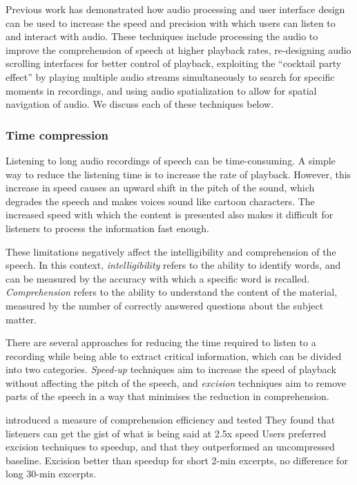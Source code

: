 Previous work has demonstrated how audio processing and user interface design can be used to increase the speed and
precision with which users can listen to and interact with audio. These techniques include processing the audio to
improve the comprehension of speech at higher playback rates, re-designing audio scrolling interfaces for better
control of playback, exploiting the ``cocktail party effect'' by playing multiple audio streams simultaneously to
search for specific moments in recordings, and using audio spatialization to allow for spatial navigation of audio. We
discuss each of these techniques below.

\subsubsection{Time compression}

Listening to long audio recordings of speech can be time-consuming. A simple way to reduce the listening time is to
increase the rate of playback.  However, this increase in speed causes an upward shift in the pitch of the sound, which
degrades the speech and makes voices sound like cartoon characters.  The increased speed with which the content is
presented also makes it difficult for listeners to process the information fast enough.

These limitations negatively affect the intelligibility and comprehension of the speech.  In this context,
\textit{intelligibility} refers to the ability to identify words, and can be measured by the accuracy with which a
specific word is recalled. \textit{Comprehension} refers to the ability to understand the content of the material,
measured by the number of correctly answered questions about the subject matter.


There are several approaches for reducing the time required to listen to a recording while being able to extract
critical information, which can be divided into two categories.  \textit{Speed-up} techniques aim to increase the speed
of playback without affecting the pitch of the speech, and \textit{excision} techniques aim to remove parts of the
speech in a way that minimises the reduction in comprehension.

\citet{Tucker2006} introduced a measure of comprehension efficiency and tested
They found that listeners can get the gist of what is being said at 2.5x speed
Users preferred excision techniques to speedup, and that they outperformed an uncompressed baseline.
Excision better than speedup for short 2-min excerpts, no difference for long 30-min excerpts.

